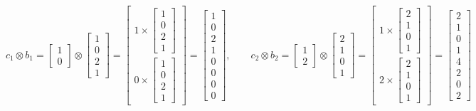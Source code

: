 \documentclass[12pt]{article}
\begin{document}
\begin{equation}
c_1 \otimes b_1
=
\begin{bmatrix}1\\0\end{bmatrix}
\otimes
\begin{bmatrix}1\\0\\2\\1\end{bmatrix}
=
\begin{bmatrix}
1 \times \begin{bmatrix}1\\0\\2\\1\end{bmatrix}\\[4pt]
0 \times \begin{bmatrix}1\\0\\2\\1\end{bmatrix}
\end{bmatrix}
=
\begin{bmatrix}1\\0\\2\\1\\0\\0\\0\\0\end{bmatrix},
\qquad
c_2 \otimes b_2
=
\begin{bmatrix}1\\2\end{bmatrix}
\otimes
\begin{bmatrix}2\\1\\0\\1\end{bmatrix}
=
\begin{bmatrix}
1 \times \begin{bmatrix}2\\1\\0\\1\end{bmatrix}\\[4pt]
2 \times \begin{bmatrix}2\\1\\0\\1\end{bmatrix}
\end{bmatrix}
=
\begin{bmatrix}2\\1\\0\\1\\4\\2\\0\\2\end{bmatrix}
\end{equation}
\end{document}
